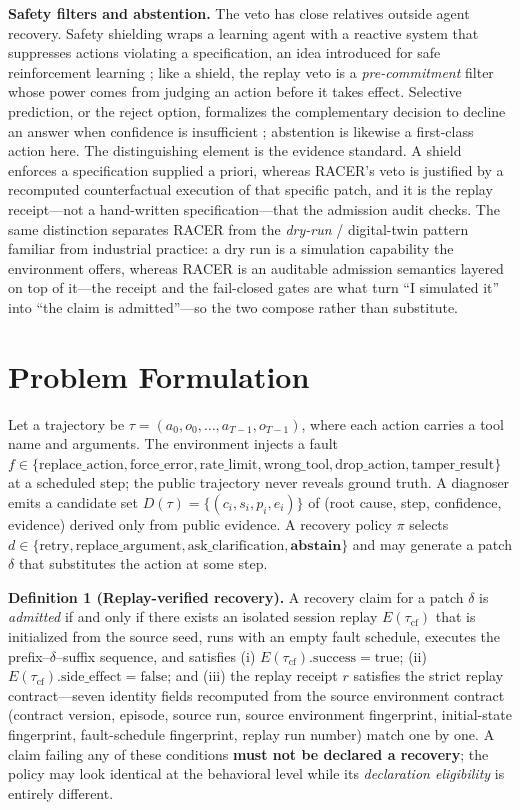 \documentclass[review]{fcs}
\begin{document}
\textbf{Safety filters and abstention.} The veto has close relatives outside agent recovery. Safety shielding wraps a learning agent with a reactive system that suppresses actions violating a specification, an idea introduced for safe reinforcement learning \cite{ref34}; like a shield, the replay veto is a \emph{pre-commitment} filter whose power comes from judging an action before it takes effect. Selective prediction, or the reject option, formalizes the complementary decision to decline an answer when confidence is insufficient \cite{ref35}; abstention is likewise a first-class action here. The distinguishing element is the evidence standard. A shield enforces a specification supplied a priori, whereas RACER's veto is justified by a recomputed counterfactual execution of that specific patch, and it is the replay receipt---not a hand-written specification---that the admission audit checks. The same distinction separates RACER from the \emph{dry-run} / digital-twin pattern familiar from industrial practice: a dry run is a simulation capability the environment offers, whereas RACER is an auditable admission semantics layered on top of it---the receipt and the fail-closed gates are what turn ``I simulated it'' into ``the claim is admitted''---so the two compose rather than substitute.

\section{Problem Formulation}

Let a trajectory be $\tau = (a_0, o_0, \ldots, a_{T-1}, o_{T-1})$, where each action carries a tool name and arguments. The environment injects a fault $f \in \{\text{replace\_action}, \text{force\_error}, \text{rate\_limit}, \text{wrong\_tool}, \text{drop\_action}, \text{tamper\_result}\}$ at a scheduled step; the public trajectory never reveals ground truth. A diagnoser emits a candidate set $D(\tau) = \{(c_i, s_i, p_i, e_i)\}$ of (root cause, step, confidence, evidence) derived only from public evidence. A recovery policy $\pi$ selects $d \in \{\text{retry}, \text{replace\_argument}, \text{ask\_clarification}, \textbf{abstain}\}$ and may generate a patch $\delta$ that substitutes the action at some step.

\textbf{Definition 1 (Replay-verified recovery).} A recovery claim for a patch $\delta$ is \emph{admitted} if and only if there exists an isolated session replay $E(\tau_{\text{cf}})$ that is initialized from the source seed, runs with an empty fault schedule, executes the prefix--$\delta$--suffix sequence, and satisfies (i) $E(\tau_{\text{cf}}).\text{success} = \text{true}$; (ii) $E(\tau_{\text{cf}}).\text{side\_effect} = \text{false}$; and (iii) the replay receipt $r$ satisfies the strict replay contract---seven identity fields recomputed from the source environment contract (contract version, episode, source run, source environment fingerprint, initial-state fingerprint, fault-schedule fingerprint, replay run number) match one by one. A claim failing any of these conditions \textbf{must not be declared a recovery}; the policy may look identical at the behavioral level while its \emph{declaration eligibility} is entirely different.
\end{document}
